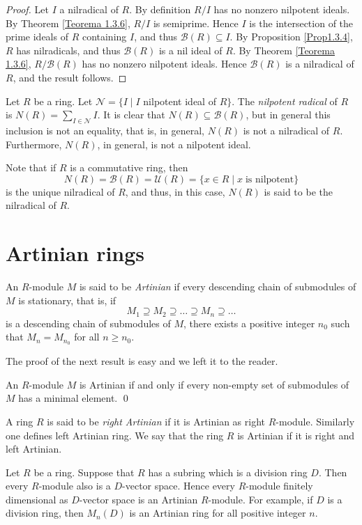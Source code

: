 \begin{proof}
Let $I$ a nilradical of $R$. By definition $R/I$ has no nonzero nilpotent ideals. By Theorem \ref{Teorema 1.3.6}, $R/I$ is semiprime. Hence
$I$  is the intersection of the prime ideals of $R$ containing $I$, and thus $\mathcal{B}(R)\subseteq I$. By Proposition \ref{Prop1.3.4}, $R$ has nilradicals, and thus $\mathcal{B}(R)$ is a nil ideal of $R$. By Theorem \ref{Teorema 1.3.6}, $R/\mathcal{B}(R)$ has no nonzero nilpotent ideals. Hence $\mathcal{B}(R)$ is a nilradical of $R$, and the result follows.
\end{proof}

Let $R$ be a ring. Let $\mathcal{N}=\{ I\mid I$ nilpotent ideal of $R\}$. The \emph{nilpotent radical} of $R$ is
$N(R)=\sum_{I\in\mathcal{N}} I$. It is clear that $N(R)\subseteq \mathcal{B}(R)$, but in general this inclusion is not an equality, 
that is, in general, $N(R)$ is not a nilradical of $R$. Furthermore,
$N(R)$, in general, is not a nilpotent ideal.

Note that if $R$ is a commutative ring, then
$$N(R)=\mathcal{B}(R)=\mathcal{U}(R)=\{ x\in R\mid x\;\mbox{is nilpotent}\}$$
is the unique nilradical of $R$, and thus, in this case,  $N(R)$ is said to be the nilradical of $R$.

\section{Artinian rings}
An $R$-module $M$ is said to be \emph{Artinian} if every descending chain of submodules of $M$ is stationary, that is, if
$$M_1\supseteq M_2\supseteq\dots\supseteq M_n\supseteq\dots$$
is a descending chain of submodules of $M$, there exists a positive integer $n_0$ such that $M_n=M_{n_0}$ for all $n\geq n_0$.

The proof of the next result is easy and we left it to the reader.

\begin{proposition}\label{Prop1.4.1}
An $R$-module $M$ is Artinian if and only if every non-empty set of submodules of $M$ has a minimal element. \qed
\end{proposition}

A ring $R$ is said to be \emph{right Artinian} if it is Artinian as right $R$-module.
Similarly one defines left Artinian ring. We say that the ring $R$ is Artinian if it is right and left Artinian.

\begin{example}
Let $R$ be a ring. Suppose that $R$ has a subring which is a division ring $D$. Then every $R$-module also is a $D$-vector space. Hence every $R$-module finitely dimensional as $D$-vector space
is an Artinian $R$-module.
For example, if $D$ is a division ring, then $M_n(D)$ is an Artinian ring for all positive integer $n$.
\end{example}


